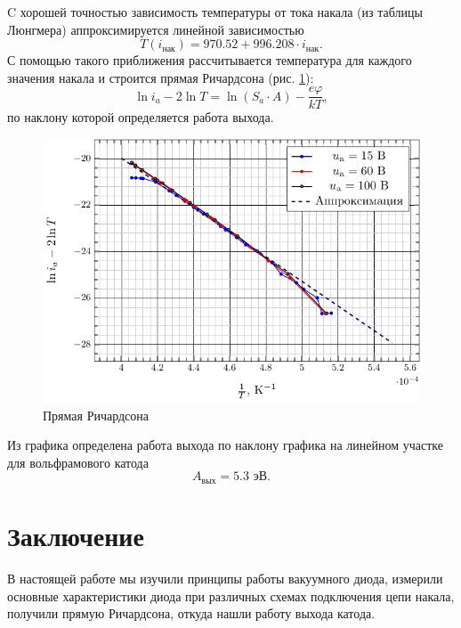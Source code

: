 \documentclass[a5paper,11pt]{extarticle}
\begin{document}
C хорошей точностью зависимость температуры от тока накала (из таблицы Люнгмера) аппроксимируется линейной зависимостью
\begin{equation}
	T(i_\text{нак})=970.52+996.208\cdot i_\text{нак}.
\end{equation}
С помощью такого приближения рассчитывается температура для каждого значения накала и строится прямая Ричардсона (рис. \ref{fig:rich}):
\begin{equation}
	\ln i_a -2\ln T = \ln(S_a\cdot A) - \frac{e\varphi}{kT},
\end{equation}
по наклону которой определяется работа выхода.
\begin{figure}[H]
	\centering
	\includegraphics[]{fig/richardson.pdf}
	\caption{Прямая Ричардсона}
	\label{fig:rich}
\end{figure}
\vspace{-0.5em}
Из графика определена работа выхода по наклону графика на линейном участке для вольфрамового катода
\begin{equation}
	A_\text{вых}=5.3 \text{ эВ}.
\end{equation}


\section*{Заключение}
В настоящей работе мы изучили принципы работы вакуумного диода, измерили основные характеристики диода при различных схемах подключения цепи накала, получили прямую Ричардсона, откуда нашли работу выхода катода.

  
  
\end{document}
